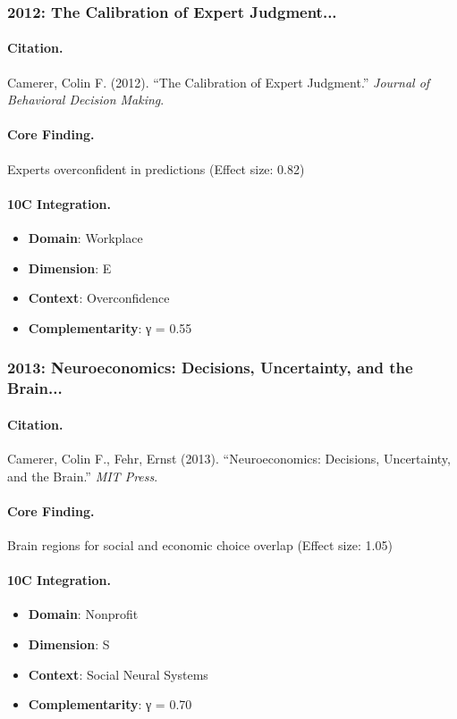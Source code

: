 \subsubsection{2012: The Calibration of Expert Judgment...}

\paragraph{Citation.}
Camerer, Colin F. (2012). ``The Calibration of Expert Judgment.''
\textit{Journal of Behavioral Decision Making}.

\paragraph{Core Finding.}
Experts overconfident in predictions (Effect size: 0.82)

\paragraph{10C Integration.}
\begin{itemize}[nosep]
  \item \textbf{Domain}: Workplace
  \item \textbf{Dimension}: E
  \item \textbf{Context}: Overconfidence
  \item \textbf{Complementarity}: γ = 0.55
\end{itemize}

\subsubsection{2013: Neuroeconomics: Decisions, Uncertainty, and the Brain...}

\paragraph{Citation.}
Camerer, Colin F., Fehr, Ernst (2013). ``Neuroeconomics: Decisions, Uncertainty, and the Brain.''
\textit{MIT Press}.

\paragraph{Core Finding.}
Brain regions for social and economic choice overlap (Effect size: 1.05)

\paragraph{10C Integration.}
\begin{itemize}[nosep]
  \item \textbf{Domain}: Nonprofit
  \item \textbf{Dimension}: S
  \item \textbf{Context}: Social Neural Systems
  \item \textbf{Complementarity}: γ = 0.70
\end{itemize}

